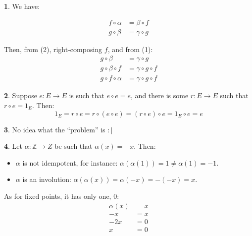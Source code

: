 \documentclass{article}
\theoremstyle{definition}
\newcommand{\bb}[1]{\mathbb{#1}}
\newcommand{\Z}{\bb{Z}}
\newcommand{\en}{\mathbin{\rotatebox[origin=c]{90}{\scriptsize $\circlearrowright$}}}
\theoremstyle{definition}
\theoremstyle{definition}
\newtheorem{solution-internal}{}[subsection]
\newenvironment{solution}{
  \begin{solution-internal}
}{
  \end{solution-internal}
}
\begin{document}
\begin{solution}
  We have:

  \begin{minipage}{.3\textwidth}
  \begin{align}
    f \circ \alpha &= \beta \circ f \\
    g \circ \beta  &= \gamma \circ g
  \end{align}
  \end{minipage}%
  \begin{minipage}{.7\textwidth}
    \begin{center}
    \end{center}
  \end{minipage}
  \vspace{10pt}

  Then, from (2), right-composing $f$, and from (1): 
  \begin{align*}
    g \circ \beta  &= \gamma \circ g \\
    g \circ \beta \circ f &= \gamma \circ g \circ f \\
    g \circ f \circ \alpha &= \gamma \circ g \circ f
  \end{align*}
\end{solution}

\begin{solution}
  Suppose $e \colon E \to E$ is such that $e \circ e = e$, and there is some $r
  \colon E \to E$ such that $r \circ e = 1_E$. Then: 
  \[ 1_E = r \circ e = r \circ (e \circ e) = (r \circ e) \circ e = 1_E \circ e =
  e \] 
\end{solution}

\begin{solution}
  No idea what the ``problem'' is $:|$
\end{solution}

\begin{solution}
  Let $\alpha \colon \Z \to Z$ be such that $\alpha (x) = -x$. Then:
  \begin{itemize}
    \item $\alpha$ is not idempotent, for instance: $\alpha(\alpha(1)) = 1 \neq \alpha(1) = -1$.
    \item $\alpha$ is an involution: $\alpha(\alpha(x)) = \alpha(-x) = -(-x) = x$.
  \end{itemize}
  As for fixed points, it has only one, 0:
  \begin{align*}
    \alpha (x) & = x \\
     -x        & = x \\
     -2x       & = 0 \\
     x         & = 0
  \end{align*}
\end{solution}
\end{document}
